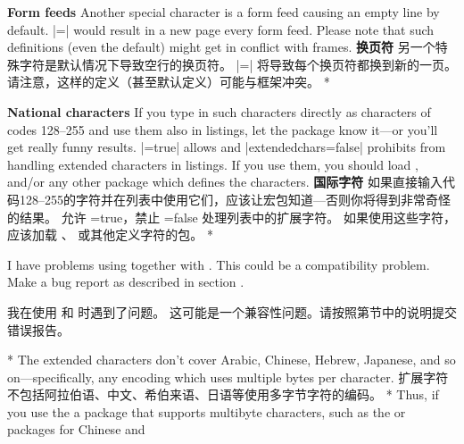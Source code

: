 \begin{paracol}{2}
\textbf{Form feeds}
Another special character is a form feed causing an empty line by default.
{\rstyle{}}|=\newpage| would result in a new page every
form feed. Please note that such definitions (even the default) might get
in conflict with frames.
\switchcolumn
\textbf{换页符}
另一个特殊字符是默认情况下导致空行的换页符。
{\rstyle{}}|=\newpage| 将导致每个换页符都换到新的一页。
请注意，这样的定义（甚至默认定义）可能与框架冲突。
\switchcolumn[0]*%

\textbf{National characters}
If you type in such characters directly as characters of codes 128--255 and
use them also in listings, let the package know it---or you'll get really
funny results. {\rstyle{}}|=true| allows and
|extendedchars=false| prohibits  from handling
extended characters in listings. If you use them, you should load
,  and/or
any other package which defines the characters.
\switchcolumn
\textbf{国际字符}
如果直接输入代码128--255的字符并在列表中使用它们，应该让宏包知道---否则你将得到非常奇怪的结果。
 允许 =true，禁止 =false 处理列表中的扩展字符。
如果使用这些字符，应该加载 、 或其他定义字符的包。
\switchcolumn[0]*%
\begin{advise}
\item I have problems using  together with
      .
      \advisespace
      This could be a compatibility problem. Make a bug report as described
      in section .
\end{advise}
\switchcolumn
\begin{advise}
\item 我在使用  和  时遇到了问题。
\advisespace
这可能是一个兼容性问题。请按照第节中的说明提交错误报告。
\end{advise}
\switchcolumn[0]*%
The extended characters don't cover Arabic, Chinese, Hebrew, Japanese, and so
on---specifically, any encoding which uses multiple bytes per character.
\switchcolumn
扩展字符不包括阿拉伯语、中文、希伯来语、日语等使用多字节字符的编码。
\switchcolumn[0]*%
Thus, if you use the a package that supports multibyte characters, such as
the  or  packages for Chinese and

\end{paracol}
